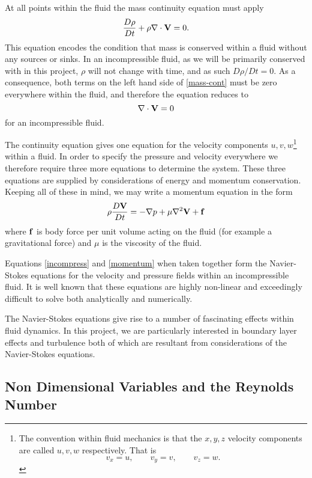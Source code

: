 At all points within the fluid the mass continuity equation must apply
\begin{equation} \label{mass-cont}
\frac{D\rho}{Dt} + \rho \nabla \cdot \mathbf{V} = 0 .
\end{equation}
This equation encodes the condition that mass is conserved within a fluid without any sources or sinks.
In an incompressible fluid, as we will be primarily conserved with in this project, $\rho$ will not
change with time, and as such $D \rho / D t = 0$. As a consequence, both terms on the left hand side of
\eqref{mass-cont} must be zero everywhere within the fluid, and therefore the equation reduces to
\begin{equation} \label{incompress}
\nabla \cdot \mathbf{V} = 0
\end{equation}
for an incompressible fluid.

The continuity equation gives one equation for the velocity components $u,v,w$\footnote{
	The convention within fluid mechanics is that the $x,y,z$ velocity components are called $u,v,w$
	respectively. That is \[
		v_x = u, \qquad v_y = v, \qquad v_z = w .
	\]
} within a fluid. In order to specify the pressure and velocity everywhere we therefore require three
more equations to determine the system. These three equations are supplied by considerations of
energy and momentum conservation. Keeping all of these in mind, we may write a
momentum equation in the form
\begin{equation} \label{momentum}
\rho \frac{D\mathbf{V}}{Dt} = - \nabla p + \mu \nabla^2 \mathbf{V} + \mathbf{f}
\end{equation}
where $\mathbf{f}$ is body force per unit volume acting on the fluid (for example a gravitational force) 
and $\mu$ is the viscosity of the fluid.

Equations \eqref{incompress} and \eqref{momentum} when taken together form the Navier-Stokes equations
for the velocity and pressure fields within an incompressible fluid. It is well known that these
equations are highly non-linear and exceedingly difficult to solve both analytically and numerically.

The Navier-Stokes equations give rise to a number of fascinating effects within fluid dynamics. In this
project, we are particularly interested in boundary layer effects and turbulence both of which are 
resultant from considerations of the Navier-Stokes equations.

\subsection{Non Dimensional Variables and the Reynolds Number}


